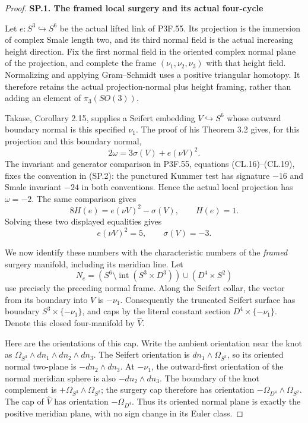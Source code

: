 \begin{proof}
\par

\medskip\noindent\textbf{SP.1. The framed local surgery and its actual four-cycle}

\par\nobreak

Let \(e:S^3\hookrightarrow S^6\) be the actual lifted link of P3F.55.
Its projection is the immersion of complex Smale length two, and its
third normal field is the actual increasing height direction. Fix the
first normal field in the oriented complex normal plane of the
projection, and complete the frame \((\nu _1,\nu _2,\nu _3)\) with
that height field. Normalizing and applying Gram--Schmidt uses a
positive triangular homotopy. It therefore retains the actual
projection-normal plus height framing, rather than adding an element
of \(\pi _3(SO(3))\).

Takase, Corollary 2.15, supplies a Seifert embedding
\(V\hookrightarrow S^6\) whose outward boundary normal is this
specified \(\nu _1\). The proof of his Theorem 3.2 gives, for this
projection and this boundary normal,
\[
              2\omega=3\sigma(V)+e(\nu V)^2.             \tag{SP.2}
\]
The invariant and generator comparison in P3F.55, equations
(CL.16)--(CL.19), fixes the convention in (SP.2): the punctured
Kummer test has signature \(-16\) and Smale invariant \(-24\)
in both conventions. Hence the actual local projection has
\(\omega=-2\). The same comparison gives
\[
             8H(e)=e(\nu V)^2-\sigma(V),\qquad H(e)=1.
                                                               \tag{SP.3}
\]
Solving these two displayed equalities gives
\[
                    e(\nu V)^2=5,\qquad \sigma(V)=-3.    \tag{SP.4}
\]

We now identify these numbers with the characteristic numbers of the
\emph{framed} surgery manifold, including its meridian line. Let
\[
 N_e=(S^6\setminus\operatorname{int}(S^3\times D^3))
                  \cup(D^4\times S^2)
\]
use precisely the preceding normal frame. Along the Seifert collar,
the vector from its boundary into \(V\) is \(-\nu _1\).
Consequently the truncated Seifert surface has boundary
\(S^3\times\{-\nu _1\}\), and caps by the literal constant section
\(D^4\times\{-\nu _1\}\). Denote this closed four-manifold by
\(\widehat V\).

Here are the orientations of this cap. Write the ambient orientation
near the knot as
\(\Omega_{S^3}\wedge dn_1\wedge dn_2\wedge dn_3\).
The Seifert orientation is
\(dn_1\wedge\Omega_{S^3}\), so its oriented normal two-plane is
\(-dn_2\wedge dn_3\). At \(-\nu _1\), the outward-first
orientation of the normal meridian sphere is also
\(-dn_2\wedge dn_3\). The boundary of the knot complement is
\(+\Omega_{S^3}\wedge\Omega_{S^2}\); the surgery cap therefore
has orientation \(-\Omega_{D^4}\wedge\Omega_{S^2}\).
The cap of \(\widehat V\) has orientation \(-\Omega_{D^4}\).
Thus its oriented normal plane is exactly the positive meridian
plane, with no sign change in its Euler class.


\end{proof}

